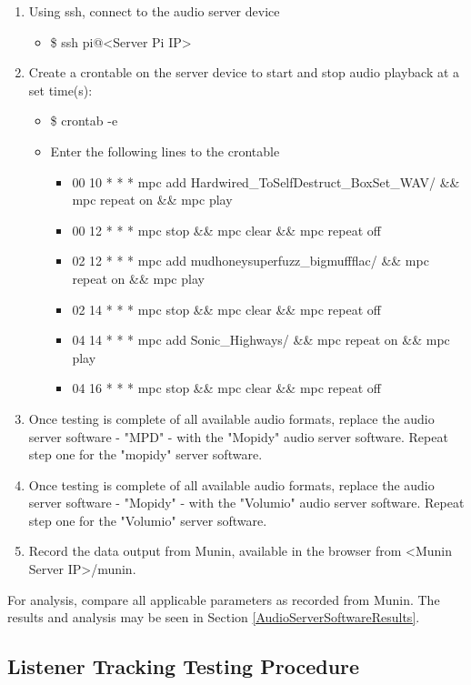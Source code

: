\documentclass[11pt,a4paper,headinclude=false,footinclude=false]{scrreprt}
\begin{document}
\begin{enumerate}
  \item Using ssh, connect to the audio server device
  \begin{itemize}
    \item \$ ssh pi@<Server Pi IP>
  \end{itemize}
  \item Create a crontable on the server device to start and stop audio playback
  at a set time(s):
  \begin{itemize}
    \item \$ crontab -e
    \item Enter the following lines to the crontable
    \begin{itemize}
     \item 00 10 * * * mpc add Hardwired\_To\textendash{}Self\textendash{}Destruct\_BoxSet\_WAV/ \&\& mpc repeat on \&\& mpc play
     \item 00 12 * * * mpc stop \&\& mpc clear \&\& mpc repeat off
     \item 02 12 * * * mpc add
     mudhoney\textendash{}superfuzz\_bigmuff\textendash{}flac/ \&\& mpc repeat on \&\& mpc play
     \item 02 14 * * * mpc stop \&\& mpc clear \&\& mpc repeat off
     \item 04 14 * * * mpc add Sonic\_Highways/ \&\& mpc repeat on \&\& mpc play
     \item 04 16 * * * mpc stop \&\& mpc clear \&\& mpc repeat off
   \end{itemize}
  \end{itemize}
  \item Once testing is complete of all available audio formats, replace the audio
   server software - "MPD" - with the "Mopidy" audio server software. Repeat step
   one for the "mopidy" server software.
  \item Once testing is complete of all available audio formats, replace the audio
   server software - "Mopidy" - with the "Volumio" audio server software. Repeat
   step one for the "Volumio" server software.
  \item Record the data output from Munin, available in the browser from <Munin
  Server IP>/munin.
\end{enumerate}

For analysis, compare all applicable parameters as recorded from Munin.
The results and analysis may be seen in Section
\ref{AudioServerSoftwareResults}.

\subsection{Listener Tracking Testing
Procedure}\label{listener-tracking-testing-procedure}
\end{document}
